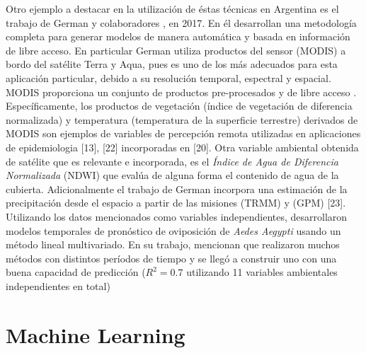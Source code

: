\par Otro ejemplo a destacar en la utilización de éstas técnicas en Argentina es
  el trabajo de German y colaboradores \cite{german_temporal}, en 2017.
  En él desarrollan una metodología completa
  para generar modelos de manera automática y basada en información de libre
  acceso. En particular German \cite{german_temporal} utiliza productos del sensor (MODIS) a bordo
  del satélite Terra y Aqua, pues es uno de los más adecuados para esta
  aplicación particular, debido a su resolución temporal, espectral y espacial.
  MODIS proporciona un conjunto de productos pre-procesados y de libre acceso \cite{terra_aqua_modis}.
  Específicamente, los productos de vegetación (índice de vegetación de diferencia
  normalizada) y temperatura (temperatura de la superficie terrestre) derivados
  de MODIS son ejemplos de variables de percepción remota utilizadas
  en aplicaciones de epidemiologia [13], [22] incorporadas en [20]. Otra variable
  ambiental obtenida de satélite que es relevante e incorporada, es el
  \textit{Índice de Agua de Diferencia Normalizada} (NDWI) que evalúa de alguna
  forma el contenido de agua de la cubierta. Adicionalmente el trabajo de German
  incorpora una estimación de la precipitación desde el espacio a partir de las
  misiones (TRMM) y (GPM) [23].
  Utilizando los datos mencionados como variables independientes,
  desarrollaron modelos temporales de pronóstico de oviposición de \textit{Aedes Aegypti}
  usando un método lineal multivariado. En su trabajo, mencionan que
  realizaron muchos métodos con distintos períodos de tiempo y se llegó a
  construir uno con una buena capacidad de
  predicción ($R^{2} = 0.7 $ utilizando 11 variables ambientales independientes en total)


  \section{Machine Learning}

